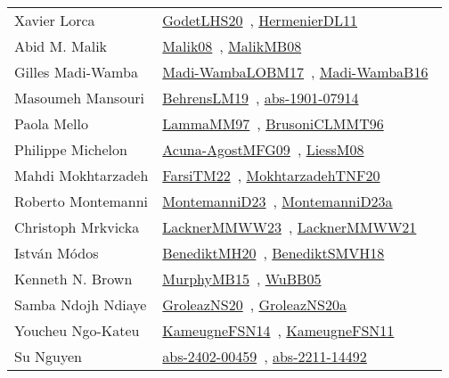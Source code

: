 {\begin{longtable}{p{4cm}p{20cm}}
Xavier Lorca & \href{works/GodetLHS20.pdf}{GodetLHS20}~\cite{GodetLHS20}, \href{works/HermenierDL11.pdf}{HermenierDL11}~\cite{HermenierDL11}\\
Abid M. Malik & \href{}{Malik08}~\cite{Malik08}, \href{works/MalikMB08.pdf}{MalikMB08}~\cite{MalikMB08}\\
Gilles Madi{-}Wamba & \href{works/Madi-WambaLOBM17.pdf}{Madi-WambaLOBM17}~\cite{Madi-WambaLOBM17}, \href{works/Madi-WambaB16.pdf}{Madi-WambaB16}~\cite{Madi-WambaB16}\\
Masoumeh Mansouri & \href{works/BehrensLM19.pdf}{BehrensLM19}~\cite{BehrensLM19}, \href{works/abs-1901-07914.pdf}{abs-1901-07914}~\cite{abs-1901-07914}\\
Paola Mello & \href{works/LammaMM97.pdf}{LammaMM97}~\cite{LammaMM97}, \href{works/BrusoniCLMMT96.pdf}{BrusoniCLMMT96}~\cite{BrusoniCLMMT96}\\
Philippe Michelon & \href{works/Acuna-AgostMFG09.pdf}{Acuna-AgostMFG09}~\cite{Acuna-AgostMFG09}, \href{works/LiessM08.pdf}{LiessM08}~\cite{LiessM08}\\
Mahdi Mokhtarzadeh & \href{}{FarsiTM22}~\cite{FarsiTM22}, \href{works/MokhtarzadehTNF20.pdf}{MokhtarzadehTNF20}~\cite{MokhtarzadehTNF20}\\
Roberto Montemanni & \href{works/MontemanniD23.pdf}{MontemanniD23}~\cite{MontemanniD23}, \href{works/MontemanniD23a.pdf}{MontemanniD23a}~\cite{MontemanniD23a}\\
Christoph Mrkvicka & \href{works/LacknerMMWW23.pdf}{LacknerMMWW23}~\cite{LacknerMMWW23}, \href{works/LacknerMMWW21.pdf}{LacknerMMWW21}~\cite{LacknerMMWW21}\\
Istv{\'{a}}n M{\'{o}}dos & \href{works/BenediktMH20.pdf}{BenediktMH20}~\cite{BenediktMH20}, \href{works/BenediktSMVH18.pdf}{BenediktSMVH18}~\cite{BenediktSMVH18}\\
Kenneth N. Brown & \href{works/MurphyMB15.pdf}{MurphyMB15}~\cite{MurphyMB15}, \href{works/WuBB05.pdf}{WuBB05}~\cite{WuBB05}\\
Samba Ndojh Ndiaye & \href{works/GroleazNS20.pdf}{GroleazNS20}~\cite{GroleazNS20}, \href{works/GroleazNS20a.pdf}{GroleazNS20a}~\cite{GroleazNS20a}\\
Youcheu Ngo{-}Kateu & \href{works/KameugneFSN14.pdf}{KameugneFSN14}~\cite{KameugneFSN14}, \href{works/KameugneFSN11.pdf}{KameugneFSN11}~\cite{KameugneFSN11}\\
Su Nguyen & \href{works/abs-2402-00459.pdf}{abs-2402-00459}~\cite{abs-2402-00459}, \href{works/abs-2211-14492.pdf}{abs-2211-14492}~\cite{abs-2211-14492}\\

\end{longtable}}
